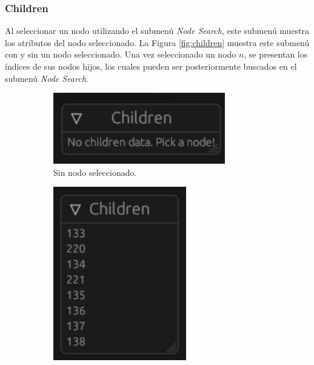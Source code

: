 \subsubsection{Children}

Al seleccionar un nodo utilizando el submenú \textit{Node Search}, este submenú muestra los atributos del nodo seleccionado. La Figura \ref{fig:children} muestra este submenú con y sin un nodo seleccionado. Una vez seleccionado un nodo $n$, se presentan los índices de sus nodos hijos, los cuales pueden ser posteriormente buscados en el submenú \textit{Node Search}.

\begin{figure}[h]
    \begin{center}
    \begin{subfigure}{.49\textwidth}
        \includegraphics[width=\textwidth]{children-off.png}
        \caption{Sin nodo seleccionado.}
    \end{subfigure}
    \begin{subfigure}{.49\textwidth}
        \includegraphics[width=\textwidth]{children-on.png}

\end{subfigure}
\end{center}
\end{figure}
